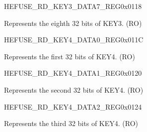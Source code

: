 \begin{register}{H}{EFUSE\_RD\_KEY3\_DATA7\_REG}{0x{}0118}\label{regdesc:EFUSERDKEY3DATA7REG}
%
\regnewline%
\begin{regdesc}\begin{reglist}
\label{fielddesc:EFUSEKEY3DATA7}\item [EFUSE\_KEY3\_DATA7] Represents the eighth 32 bits of KEY3. (RO)
\end{reglist}\end{regdesc}
\end{register}


\begin{register}{H}{EFUSE\_RD\_KEY4\_DATA0\_REG}{0x{}011C}\label{regdesc:EFUSERDKEY4DATA0REG}
%
\regnewline%
\begin{regdesc}\begin{reglist}
\label{fielddesc:EFUSEKEY4DATA0}\item [EFUSE\_KEY4\_DATA0] Represents the first 32 bits of KEY4. (RO)
\end{reglist}\end{regdesc}
\end{register}


\begin{register}{H}{EFUSE\_RD\_KEY4\_DATA1\_REG}{0x{}0120}\label{regdesc:EFUSERDKEY4DATA1REG}
%
\regnewline%
\begin{regdesc}\begin{reglist}
\label{fielddesc:EFUSEKEY4DATA1}\item [EFUSE\_KEY4\_DATA1] Represents the second 32 bits of KEY4. (RO)
\end{reglist}\end{regdesc}
\end{register}


\begin{register}{H}{EFUSE\_RD\_KEY4\_DATA2\_REG}{0x{}0124}\label{regdesc:EFUSERDKEY4DATA2REG}
%
\regnewline%
\begin{regdesc}\begin{reglist}
\label{fielddesc:EFUSEKEY4DATA2}\item [EFUSE\_KEY4\_DATA2] Represents the third 32 bits of KEY4. (RO)
\end{reglist}\end{regdesc}
\end{register}


